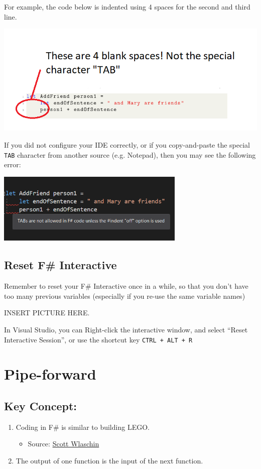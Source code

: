 \documentclass[12pt]{article}
\begin{document}
For example, the code below is indented using 4 spaces for the second and third line.
\begin{center}
\includegraphics[width=16cm]{pictures/picture19.png}
\end{center}
If you did not configure your IDE correctly, or if you copy-and-paste the special \texttt{TAB} character from another source (e.g. Notepad), then you may see the following error:
\begin{center}
\includegraphics[width=9cm]{pictures/picture20.png}
\end{center}
\subsection{Reset F\# Interactive}
Remember to reset your F\# Interactive once in a while, so that you don't have too many previous variables (especially if you re-use the same variable names)

\begin{center}
INSERT PICTURE HERE.
\end{center}

In Visual Studio, you can Right-click the interactive window, and select ``Reset Interactive Session'', or use the shortcut key \texttt{CTRL + ALT + R}
\pagebreak

\section{Pipe-forward}
\subsection*{Key Concept:}
\begin{enumerate}
\item Coding in F\# is similar to building LEGO. 
\begin{itemize}
\item Source: \href{https://fsharpforfunandprofit.com/posts/defining-functions/}{Scott Wlaschin}
\end{itemize}
\item The output of one function is the input of the next function.
\end{enumerate}
\end{document}
